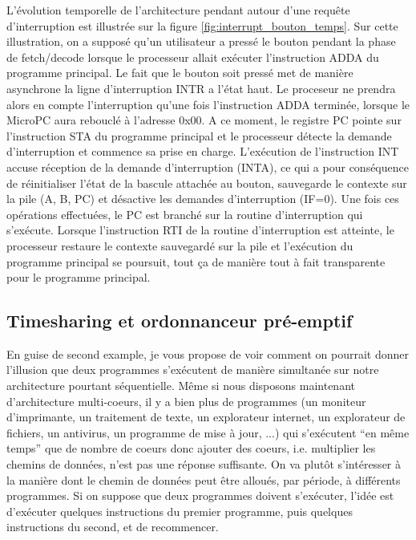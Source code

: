 L'évolution temporelle de l'architecture pendant autour d'une requête d'interruption est illustrée sur la figure \ref{fig:interrupt_bouton_temps}. Sur cette illustration, on a supposé qu'un utilisateur a pressé le bouton pendant la phase de fetch/decode lorsque le processeur allait exécuter l'instruction ADDA du programme principal. Le fait que le bouton soit pressé met de manière asynchrone la ligne d'interruption INTR a l'état haut. Le proceseur ne prendra alors en compte l'interruption qu'une fois l'instruction ADDA terminée, lorsque le MicroPC aura rebouclé à l'adresse 0x00. A ce moment, le registre PC pointe sur l'instruction STA du programme principal et le processeur détecte la demande d'interruption et commence sa prise en charge. L'exécution de l'instruction INT accuse réception de la demande d'interruption (INTA), ce qui a pour conséquence de réinitialiser l'état de la bascule attachée au bouton, sauvegarde le contexte sur la pile (A, B, PC) et désactive les demandes d'interruption (IF=0). Une fois ces opérations effectuées, le PC est branché sur la routine d'interruption qui s'exécute. Lorsque l'instruction RTI de la routine d'interruption est atteinte, le processeur restaure le contexte sauvegardé sur la pile et l'exécution du programme principal se poursuit, tout ça de manière tout à fait transparente pour le programme principal.

\subsection{Timesharing et ordonnanceur pré-emptif}

En guise de second example, je vous propose de voir comment on pourrait donner l'illusion que deux programmes s'exécutent de manière simultanée sur notre architecture pourtant séquentielle. Même si nous disposons maintenant d'architecture multi-coeurs, il y a bien plus de programmes (un moniteur d'imprimante, un traitement de texte, un explorateur internet, un explorateur de fichiers, un antivirus, un programme de mise à jour, ...) qui s'exécutent ``en même temps'' que de nombre de coeurs donc ajouter des coeurs, i.e. multiplier les chemins de données, n'est pas une réponse suffisante. On va plutôt s'intéresser à la manière dont le chemin de données peut être alloués, par période, à différents programmes. Si on suppose que deux programmes doivent s'exécuter, l'idée est d'exécuter quelques instructions du premier programme, puis quelques instructions du second, et de recommencer.

